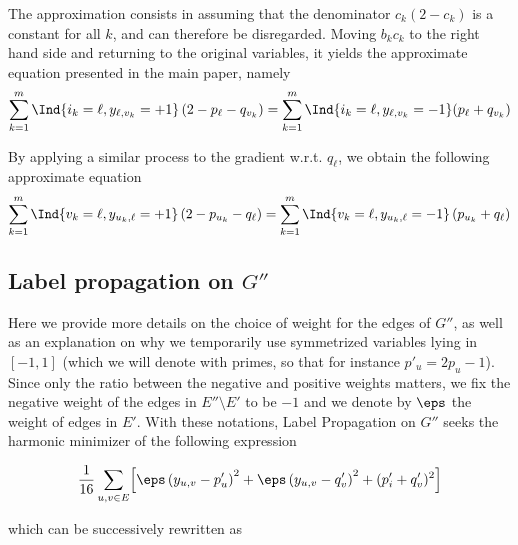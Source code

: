 The approximation consists in assuming that the denominator $c_k(2-c_k)$ is a
constant for all $k$, and can therefore be disregarded.
Moving $b_kc_k$ to the right hand side and returning to the original variables,
it yields the approximate equation presented in the main paper, namely
\begin{align*}
  \sum_{k=1}^m \Ind{i_k = \ell,y_{\ell,v_k}=+1} \left(2-p_{\ell}-q_{v_k}\right)
  = \sum_{k=1}^m \Ind{i_k = \ell,y_{\ell,v_k}=-1}
  (p_{\ell}+q_{v_k})
\end{align*}

By applying a similar process to the gradient w.r.t. $q_\ell$, we obtain the
following approximate equation
\begin{align*}
\sum_{k=1}^m \Ind{v_k = \ell,y_{u_k,\ell}=+1} \left(2-p_{u_k}-q_{\ell}\right)
= \sum_{k=1}^m  \Ind{v_k = \ell,y_{u_k,\ell}=-1}
\left(p_{u_k}+q_{\ell}\right)
\end{align*}

\subsection{Label propagation on $G''$}
\label{ssec:troll_lprop_weights}

Here we provide more details on the choice of weight for the edges of $G''$, as well as an
explanation on why we temporarily use symmetrized variables lying in $[-1, 1]$ (which we will denote
with primes, so that for instance $p'_u = 2p_u-1$). Since only the ratio between the negative and
positive weights matters, we fix the negative weight of the edges in $E''\setminus E'$ to be $-1$
and we denote by $\eps$ the weight of edges in $E'$.  With these notations, Label Propagation on
$G''$ seeks the harmonic minimizer of the following expression 

\begin{equation*}
  \frac{1}{16} \sum_{u,v \in E} \Bigl[ \eps\left(y_{u,v} - p_u'\right)^2 + \eps\left(y_{u,v} - q_v'\right)^2 + (p'_i+q_v')^2 \Bigr]
\end{equation*}

which can be successively rewritten as

